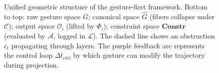 \documentclass[11pt, a4paper]{article}
\begin{document}
\begin{figure}[p]
\caption{Unified geometric structure of the gesture-first framework.
Bottom to top: raw gesture space $G$; canonical space $\hat{G}$ (fibers
collapse under $\mathcal{C}$); output space $\mathcal{O}_i$ (lifted by
$\Phi_i$); constraint space $\mathbf{Constr}$ (evaluated by $\mathcal{A}$,
logged in $\mathcal{L}$). The dashed line shows an obstruction $\epsilon_t$
propagating through layers. The purple feedback arc represents the
control loop $\Delta t_{\mathrm{ctrl}}$ by which gesture can modify the
trajectory during projection.}
\label{fig:master}
\end{figure}

\FloatBarrier
\end{document}
